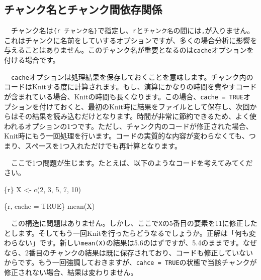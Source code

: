 \documentclass[
  a4paper,
  pandoc,
  ja=standard,
  jafont=haranoaji]{bxjsbook}
\newenvironment{Shaded}{\begin{snugshade}}{\end{snugshade}}
\newcommand{\DecValTok}[1]{\textcolor[rgb]{0.68,0.00,0.00}{#1}}
\newcommand{\FunctionTok}[1]{\textcolor[rgb]{0.28,0.35,0.67}{#1}}
\newcommand{\InformationTok}[1]{\textcolor[rgb]{0.37,0.37,0.37}{#1}}
\newcommand{\NormalTok}[1]{\textcolor[rgb]{0.00,0.48,0.65}{#1}}
\newcommand{\OtherTok}[1]{\textcolor[rgb]{0.00,0.48,0.65}{#1}}
\begin{document}
\hypertarget{ux30c1ux30e3ux30f3ux30afux540dux3068ux30c1ux30e3ux30f3ux30afux9593ux4f9dux5b58ux95a2ux4fc2}{%
\subsection{チャンク名とチャンク間依存関係}\label{ux30c1ux30e3ux30f3ux30afux540dux3068ux30c1ux30e3ux30f3ux30afux9593ux4f9dux5b58ux95a2ux4fc2}}

　チャンク名は\texttt{\{r\ チャンク名\}}で指定し、\texttt{r}と\texttt{チャンク名}の間には\texttt{,}が入りません。これはチャンクに名前をしていするオプションですが、多くの場合分析に影響を与えることはありません。このチャンク名が重要となるのは\texttt{cache}オプションを付ける場合です。

　\texttt{cache}オプションは処理結果を保存しておくことを意味します。チャンク内のコードはKnitする度に計算されます。もし、演算にかなりの時間を費やすコードが含まれている場合、Knitの時間も長くなります。この場合、\texttt{cache\ =\ TRUE}オプションを付けておくと、最初のKnit時に結果をファイルとして保存し、次回からはその結果を読み込むだけとなります。時間が非常に節約できるため、よく使われるオプションの1つです。ただし、チャンク内のコードが修正された場合、Knit時にもう一回処理を行います。コードの実質的な内容が変わらなくても、つまり、スペースを1つ入れただけでも再計算となります。

　ここで1つ問題が生じます。たとえば、以下のようなコードを考えてみてください。

\begin{Shaded}
\begin{Highlighting}[]
\InformationTok{\textasciigrave{}\textasciigrave{}\textasciigrave{}\{r\}}
\NormalTok{X }\OtherTok{\textless{}{-}} \FunctionTok{c}\NormalTok{(}\DecValTok{2}\NormalTok{, }\DecValTok{3}\NormalTok{, }\DecValTok{5}\NormalTok{, }\DecValTok{7}\NormalTok{, }\DecValTok{10}\NormalTok{)}
\InformationTok{\textasciigrave{}\textasciigrave{}\textasciigrave{}}

\InformationTok{\textasciigrave{}\textasciigrave{}\textasciigrave{}\{r, cache = TRUE\}}
\FunctionTok{mean}\NormalTok{(X)}
\InformationTok{\textasciigrave{}\textasciigrave{}\textasciigrave{}}
\end{Highlighting}
\end{Shaded}

　この構造に問題はありません。しかし、ここで\texttt{X}の5番目の要素を11に修正したとします。そしてもう一回Knitを行ったらどうなるでしょうか。正解は「何も変わらない」です。新しい\texttt{mean(X)}の結果は5.6のはずですが、5.4のままです。なぜなら、2番目のチャンクの結果は既に保存されており、コードも修正していないからです。もう一回強調しておきますが、\texttt{cahce\ =\ TRUE}の状態で当該チャンクが修正されない場合、結果は変わりません。
\end{document}
